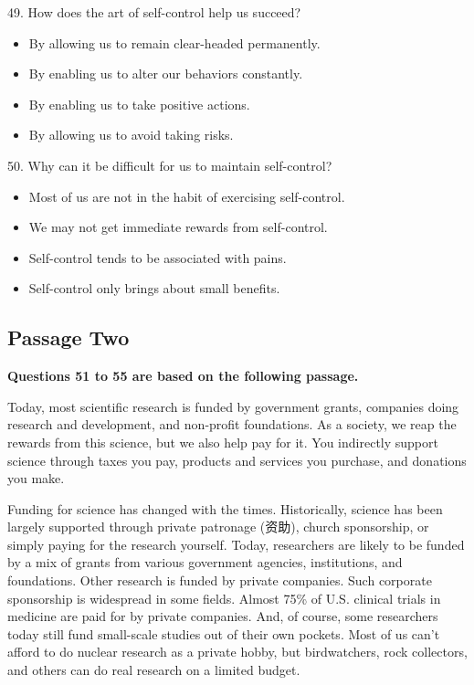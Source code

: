 \documentclass[UTF8,11pt]{ctexart}
\begin{document}
49. How does the art of self-control help us succeed?


\begin{itemize}[leftmargin=2em,itemsep=.2em,topsep=.4em]\item[A.] By allowing us to remain clear-headed permanently.
\item[B.] By enabling us to alter our behaviors constantly.
\item[C.] By enabling us to take positive actions.
\item[D.] By allowing us to avoid taking risks.
\end{itemize}

50. Why can it be difficult for us to maintain self-control?


\begin{itemize}[leftmargin=2em,itemsep=.2em,topsep=.4em]\item[A.] Most of us are not in the habit of exercising self-control.
\item[B.] We may not get immediate rewards from self-control.
\item[C.] Self-control tends to be associated with pains.
\item[D.] Self-control only brings about small benefits.
\end{itemize}

\subsection*{\textbf{Passage Two}}


\textbf{Questions 51 to 55 are based on the following passage.}


Today, most scientific research is funded by government grants, companies doing research and development, and non-profit foundations. As a society, we reap the rewards from this science, but we also help pay for it. You indirectly support science through taxes you pay, products and services you purchase, and donations you make.


Funding for science has changed with the times. Historically, science has been largely supported through private patronage (资助), church sponsorship, or simply paying for the research yourself. Today, researchers are likely to be funded by a mix of grants from various government agencies, institutions, and foundations. Other research is funded by private companies. Such corporate sponsorship is widespread in some fields. Almost 75\% of U.S. clinical trials in medicine are paid for by private companies. And, of course, some researchers today still fund small-scale studies out of their own pockets. Most of us can’t afford to do nuclear research as a private hobby, but birdwatchers, rock collectors, and others can do real research on a limited budget.
\end{document}
